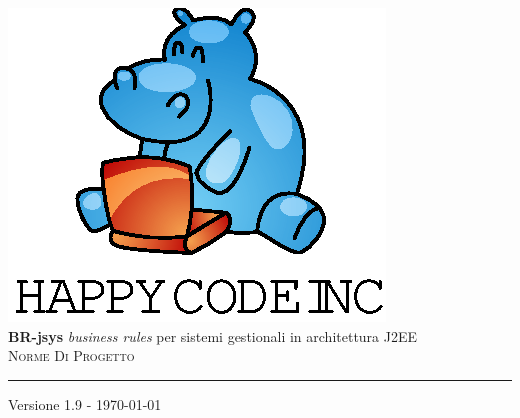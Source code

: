 \documentclass[11pt,titlepage,a4paper]{report}
\begin{document}
\newcommand{\lv}{ 1.9 } %
\newcommand{\dt}{ Norme Di Progetto }%
\newcommand{\Glossario}{ Glossario.1.4.pdf }



\begin{titlepage}\begin{center}
\vspace*{0.5in}
\includegraphics{logo.eps}
\vspace*{0.2in} \\
{\Large \textbf{BR-jsys}}
{\Large \emph{business rules} per sistemi gestionali in architettura J2EE } 
\vspace{2in} \\
\Huge \textsc{ \dt }
\par\rule{10cm}{0.4pt} \par {\large Versione \lv - \today} \\
\end{center}\end{titlepage}
\vspace*{0.5in}
\end{document}
